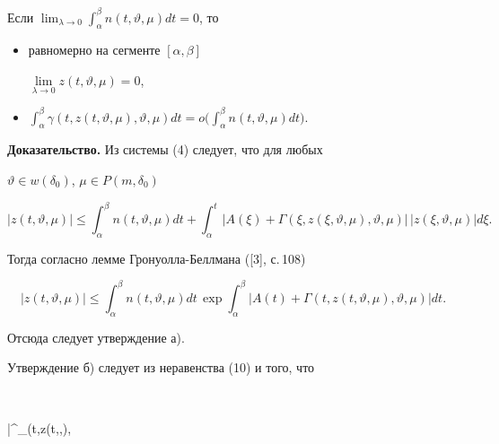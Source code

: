 \begin{lemnonum} 


Если $\displaystyle{\lim_{\lambda\to0}\int^\beta_\alpha 


n(t,\vartheta,\mu)dt=0}$, то 


\begin{itemize} 


\item[а)] равномерно на сегменте $[\alpha,\beta]$\; 


$\lim\limits_{\lambda\to0}z(t,\vartheta,\mu)=0$, 


\item[б)] $\displaystyle{\int^\beta_\alpha 


\gamma(t,z(t,\vartheta,\mu),\vartheta,\mu)dt= o\bigg(\int^\beta_\alpha 


n(t,\vartheta,\mu)dt\bigg)}$. 


\end{itemize} 


\end{lemnonum} 


 


{\bf Доказательство.} Из системы (4) следует, что для любых 


$\vartheta\in w(\delta_0)$, $\mu\in P(m,\delta_0)$ 


$$ 


|z(t,\vartheta,\mu)|\le\int^\beta_\alpha 


n(t,\vartheta,\mu)dt+\int^t_\alpha 


|A(\xi)+\Gamma(\xi,z(\xi,\vartheta,\mu),\vartheta,\mu)|\, 


|z(\xi,\vartheta,\mu)|d\xi. 


$$ 


Тогда согласно лемме Гронуолла-Беллмана ([3], с.\,108) 


\begin{equation} 


|z(t,\vartheta,\mu)|\le\int^\beta_\alpha 


n(t,\vartheta,\mu)dt\,\exp\int^\beta_\alpha 


|A(t)+\Gamma(t,z(t,\vartheta,\mu),\vartheta,\mu)|dt. 


\end{equation} 


Отсюда следует утверждение а). 


Утверждение б) следует из неравенства (10) и того, что 


$$ 


\bigg|\int^\beta_\alpha \gamma(t,z(t,\vartheta,\mu), 


